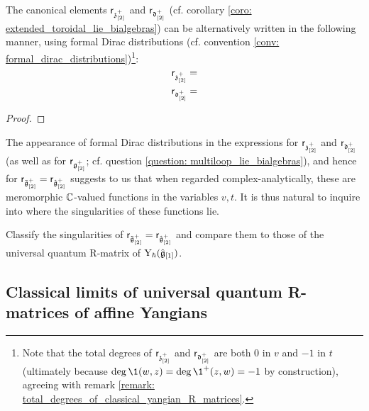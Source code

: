         \begin{proposition} \label{prop: toroidal_classical_R_matrices_in_terms_of_formal_distributions}
            The canonical elements $\mathsf{r}_{\mathfrak{z}_{[2]}^+}$ and $\mathsf{r}_{\mathfrak{d}_{[2]}^+}$ (cf. corollary \ref{coro: extended_toroidal_lie_bialgebras}) can be alternatively written in the following manner, using formal Dirac distributions (cf. convention \ref{conv: formal_dirac_distributions})\footnote{Note that the total degrees of $\mathsf{r}_{\mathfrak{z}_{[2]}^+}$ and $\mathsf{r}_{\mathfrak{d}_{[2]}^+}$ are both $0$ in $v$ and $-1$ in $t$ (ultimately because $\deg \1(w, z) = \deg \1^+(z, w) = -1$ by construction), agreeing with remark \ref{remark: total_degrees_of_classical_yangian_R_matrices}.}:
                $$\mathsf{r}_{\mathfrak{z}_{[2]}^+} = $$
                $$\mathsf{r}_{\mathfrak{d}_{[2]}^+} = $$
        \end{proposition}
            \begin{proof}
                
            \end{proof}
        \begin{remark} \label{remark: toroidal_classical_R_matrices_as_meromorphic_functions}
            The appearance of formal Dirac distributions in the expressions for $\mathsf{r}_{\mathfrak{z}_{[2]}^+}$ and $\mathsf{r}_{\mathfrak{d}_{[2]}^+}$ (as well as for $\mathsf{r}_{\mathfrak{g}_{[2]}^+}$; cf. question \ref{question: multiloop_lie_bialgebras}), and hence for $\mathsf{r}_{\tilde{\mathfrak{g}}_{[2]}^+} = \mathsf{r}_{\hat{\mathfrak{g}}_{[2]}^+}$ suggests to us that when regarded complex-analytically, these are meromorphic $\mathbb{C}$-valued functions in the variables $v, t$. It is thus natural to inquire into where the singularities of these functions lie. 
        \end{remark}
        \begin{question}
            Classify the singularities of $\mathsf{r}_{\tilde{\mathfrak{g}}_{[2]}^+} = \mathsf{r}_{\hat{\mathfrak{g}}_{[2]}^+}$ and compare them to those of the universal quantum R-matrix of $\mathrm{Y}_{\hbar}(\hat{\mathfrak{g}}_{[1]})$. 
        \end{question}

    \subsection{Classical limits of universal quantum R-matrices of affine Yangians}